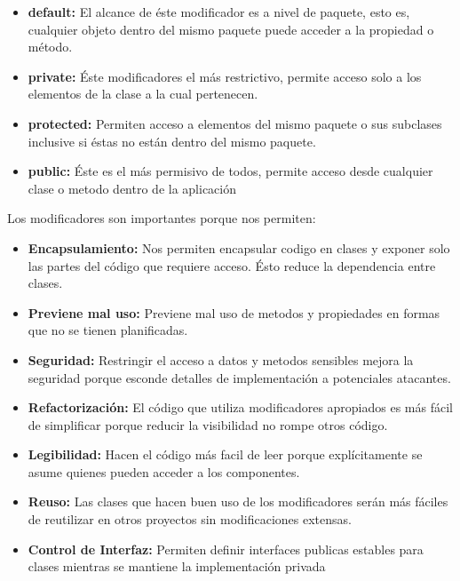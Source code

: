 \documentclass[12pt,article,oneside]{memoir}
\begin{document}
			\begin{itemize}
				\item \textbf{default:} El alcance de \'este modificador es a nivel de paquete, esto es, cualquier objeto dentro 
				del mismo paquete puede acceder a la propiedad o m\'etodo.
				
				\item \textbf{private:} \'Este modificadores el m\'as restrictivo, permite acceso solo a los elementos de la 
				clase a la cual pertenecen.
				
				\item \textbf{protected:} Permiten acceso a elementos del mismo paquete o sus subclases inclusive si \'estas no 
				est\'an dentro del mismo paquete.
				
				\item \textbf{public:} \'Este es el m\'as permisivo de todos, permite acceso desde cualquier clase o metodo
				dentro de la aplicaci\'on
			\end{itemize}
			
		Los modificadores son importantes porque nos permiten:
		
			\begin{itemize}
				\item \textbf{Encapsulamiento:} Nos permiten encapsular codigo en clases y exponer solo las partes del 
				c\'odigo que requiere acceso. \'Esto reduce la dependencia entre clases.

				\item \textbf{Previene mal uso:} Previene mal uso de metodos y propiedades en formas que no se tienen 
				planificadas.
				
				\item \textbf{Seguridad:} Restringir el acceso a datos y metodos sensibles mejora la seguridad porque 
				esconde detalles de implementaci\'on a potenciales atacantes.
				
				\item \textbf{Refactorizaci\'on:} El c\'odigo que utiliza modificadores apropiados es m\'as f\'acil de 
				simplificar porque reducir la visibilidad no rompe otros c\'odigo.
				
				\item \textbf{Legibilidad:} Hacen el c\'odigo m\'as facil de leer porque expl\'icitamente se asume 
				quienes pueden acceder a los componentes.
				
				\item \textbf{Reuso:} Las clases que hacen buen uso de los modificadores ser\'an m\'as f\'aciles de 
				reutilizar en otros proyectos sin modificaciones extensas.
				
				\item \textbf{Control de Interfaz:} Permiten definir interfaces publicas estables para clases mientras 
				se mantiene la implementaci\'on privada
			\end{itemize}
			
\end{document}
